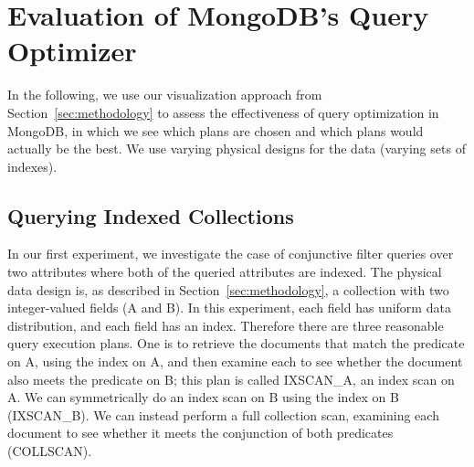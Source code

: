 \section{Evaluation of MongoDB's \approachName Query Optimizer}
\label{sec:evaluation}

In the following, we use our visualization approach from Section~\ref{sec:methodology} to assess the effectiveness of \approachName query optimization in MongoDB, in which we see which plans are chosen and which plans would actually be the best. We use varying physical designs for the data (varying sets of indexes).




\subsection{Querying Indexed Collections}
\label{sec:evaluation_bothindexed}
In our first experiment, we investigate the case of conjunctive filter queries over two attributes where both of the queried attributes are indexed. The physical data design is, as described in Section~\ref{sec:methodology}, a collection with two integer-valued fields (A and B). In this experiment, each field has uniform data distribution, and each field has an index. Therefore there are three reasonable query execution plans. One is to retrieve the documents that match the predicate on A, using the index on A, and then examine each to see whether the document also meets the predicate on B; this plan is called IXSCAN\_A, an index scan on A. We can symmetrically do an index scan on B using the index on B (IXSCAN\_B). We can instead perform a full collection scan, examining each document to see whether it meets the conjunction of both predicates (COLLSCAN). %


